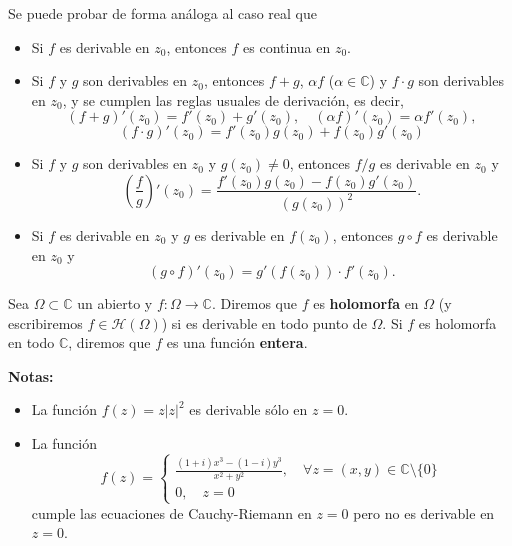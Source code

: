 Se puede probar de forma análoga al caso real que

\begin{itemize}
    \item Si $f$ es derivable en $z_0$, entonces $f$ es continua en $z_0$.
    \item Si $f$ y $g$ son derivables en $z_0$, entonces $f+g$, $\alpha f$ ($\alpha \in \mathbb{C}$) y $f \cdot g$ son derivables en $z_0$, y se cumplen las reglas usuales de derivación, es decir,
    \[
        (f+g)'(z_0) = f'(z_0) + g'(z_0), \quad (\alpha f)'(z_0) = \alpha f'(z_0),
    \]
    \[
        (f \cdot g)'(z_0) = f'(z_0) g(z_0) + f(z_0) g'(z_0)
    \]
    \item Si $f$ y $g$ son derivables en $z_0$ y $g(z_0) \neq 0$, entonces $f/g$ es derivable en $z_0$ y
    \[
        \left(\frac{f}{g}\right)'(z_0) = \frac{f'(z_0) g(z_0) - f(z_0) g'(z_0)}{(g(z_0))^2}.
    \]
    \item Si $f$ es derivable en $z_0$ y $g$ es derivable en $f(z_0)$, entonces $g \circ f$ es derivable en $z_0$ y
    \[
        (g \circ f)'(z_0) = g'(f(z_0)) \cdot f'(z_0).
    \]
\end{itemize}

\begin{definición} 
    Sea $\Omega \subset \mathbb{C}$ un abierto y $f : \Omega \to \mathbb{C}$. Diremos que $f$ es \textbf{holomorfa} en $\Omega$ (y escribiremos $f \in \mathcal{H}(\Omega)$) si es derivable en todo punto de $\Omega$. Si $f$ es holomorfa en todo $\mathbb{C}$, diremos que $f$ es una función \textbf{entera}.
\end{definición}

\textbf{Notas:}

\begin{itemize}
    \item La función $f(z) = z |z|^2$ es derivable sólo en $z=0$.
    \item La función 
    \[
        f(z) = \begin{cases}
            \frac{(1+i)x^3 - (1-i)y^3}{x^2 + y^2}, \quad \forall z = (x,y) \in \mathbb{C} \setminus \{0\} \\
            0, \quad z=0
        \end{cases}
    \]
    cumple las ecuaciones de Cauchy-Riemann en $z=0$ pero no es derivable en $z=0$.
\end{itemize}

